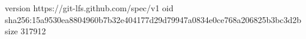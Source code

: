 version https://git-lfs.github.com/spec/v1
oid sha256:15a9530ea8804960b7b32e404177d29d79947a0834e0ce768a206825b3bc3d2b
size 317912
